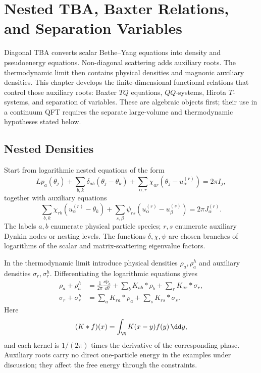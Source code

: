 \chapter{Nested TBA, Baxter Relations, and Separation Variables}
\label{ch:integrable-nested-tba-tq-separation-variables}

\ConventionsLorentzian

Diagonal TBA converts scalar Bethe--Yang equations into density and
pseudoenergy equations.  Non-diagonal scattering adds auxiliary roots.  The
thermodynamic limit then contains physical densities and magnonic auxiliary
densities.  This chapter develops the finite-dimensional functional
relations that control those auxiliary roots: Baxter \(TQ\) equations,
\(QQ\)-systems, Hirota \(T\)-systems, and separation of variables.  These are
algebraic objects first; their use in a continuum QFT requires the separate
large-volume and thermodynamic hypotheses stated below.

\section{Nested Densities}

Start from logarithmic nested equations of the form
\[
  Lp_a(\theta_j)
  +
  \sum_{b,k}\delta_{ab}(\theta_j-\theta_k)
  +
  \sum_{\alpha,r}\chi_{a r}(\theta_j-u_\alpha^{(r)})
  =
  2\pi I_j ,
\]
together with auxiliary equations
\[
  \sum_{b,k}\chi_{r b}(u_\alpha^{(r)}-\theta_k)
  +
  \sum_{s,\beta}\psi_{rs}(u_\alpha^{(r)}-u_\beta^{(s)})
  =
  2\pi J_\alpha^{(r)} .
\]
The labels \(a,b\) enumerate physical particle species; \(r,s\) enumerate
auxiliary Dynkin nodes or nesting levels.  The functions \(\delta,\chi,\psi\)
are chosen branches of logarithms of the scalar and matrix-scattering
eigenvalue factors.

In the thermodynamic limit introduce physical densities
\(\rho_a,\rho_a^h\) and auxiliary densities
\(\sigma_r,\sigma_r^h\).  Differentiating the logarithmic equations gives
\begin{align}
  \rho_a+\rho_a^h
  &=
  \frac{1}{2\pi}\frac{\dd p_a}{\dd\theta}
  +\sum_b K_{ab}*\rho_b
  +\sum_r K_{a r}*\sigma_r ,
  \label{eq:nested-tba-physical-density}\\
  \sigma_r+\sigma_r^h
  &=
  \sum_a K_{r a}*\rho_a
  +\sum_s K_{rs}*\sigma_s .
  \label{eq:nested-tba-aux-density}
\end{align}
Here
\[
  (K*f)(x)=\int_\R K(x-y)f(y)\,\dd y,
\]
and each kernel is \(1/(2\pi)\) times the derivative of the corresponding
phase.  Auxiliary roots carry no direct one-particle energy in the examples
under discussion; they affect the free energy through the constraints.


